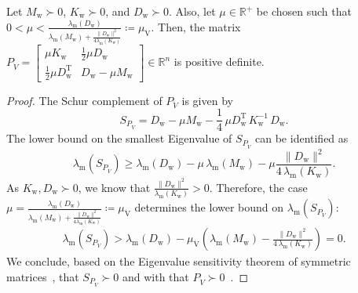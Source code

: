 \begin{lemma}\label{lemma:con:P_V_d_positive_definite}
    Let $M_\mathrm{w} \succ 0$, $K_\mathrm{w} \succ 0$, and $D_\mathrm{w} \succ 0$. Also, let $\mu \in \mathbb{R}^+$ be chosen such that $0 < \mu < \frac{\lambda_\mathrm{m}(D_\mathrm{w})}{\lambda_\mathrm{m}(M_\mathrm{w}) + \frac{\lVert D_\mathrm{w} \rVert^2}{4 \lambda_\mathrm{m} (K_\mathrm{w})}} \coloneqq \mu_{\dot{\mathrm{V}}}$.
    Then, the matrix $P_{\dot{V}} = \begin{bmatrix}
        \mu K_\mathrm{w} & \frac{1}{2} \mu D_\mathrm{w}\\
        \frac{1}{2} \mu D_\mathrm{w}^\mathrm{T} & D_\mathrm{w} - \mu M_\mathrm{w}
    \end{bmatrix} \in \mathbb{R}^{n}$ is positive definite.
\end{lemma}
\begin{proof}
    The Schur complement of $P_{\dot{V}}$ is given by
    \begin{equation}
        S_{P_{\dot{V}}} = D_\mathrm{w} - \mu M_\mathrm{w} - \frac{1}{4} \, \mu D_\mathrm{w}^\mathrm{T} \, K_\mathrm{w}^{-1} \, D_\mathrm{w}.
    \end{equation}
    The lower bound on the smallest Eigenvalue of $S_{P_{\dot{V}}}$ can be identified as
    \begin{equation}
        \lambda_\mathrm{m} \left (S_{P_{\dot{V}}} \right ) \geq \lambda_\mathrm{m}(D_\mathrm{w}) - \mu \, \lambda_\mathrm{m}(M_\mathrm{w}) - \mu \frac{\lVert D_\mathrm{w} \rVert^2}{4 \, \lambda_\mathrm{m}(K_\mathrm{w})}.
    \end{equation}
    As $K_\mathrm{w}, D_\mathrm{w} \succ 0$, we know that $\frac{\lVert D_\mathrm{w} \rVert^2}{\lambda_\mathrm{m}(K_\mathrm{w})} > 0$. Therefore, the case $\mu = \frac{\lambda_\mathrm{m}(D_\mathrm{w})}{\lambda_\mathrm{m}(M_\mathrm{w}) + \frac{\lVert D_\mathrm{w} \rVert^2}{4 \lambda_\mathrm{m} (K_\mathrm{w})}} \coloneqq \mu_{\dot{\mathrm{V}}}$ determines the lower bound on $\lambda_\mathrm{m}(S_{P_{\dot{V}}})$:
    \begin{equation}
    \begin{split}
        \lambda_\mathrm{m} \left (S_{P_{\dot{V}}} \right ) > \lambda_\mathrm{m}(D_\mathrm{w}) - \mu_{\dot{\mathrm{V}}} \left ( \lambda_\mathrm{m}(M_\mathrm{w}) - \frac{\lVert D_\mathrm{w} \rVert^2}{4 \, \lambda_\mathrm{m}(K_\mathrm{w})} \right ) = 0.
    \end{split}
    \end{equation}
    We conclude, based on the Eigenvalue sensitivity theorem of symmetric matrices~\cite{golub2013matrix}, that $S_{P_{\dot{V}}} \succ 0$ and with that $P_{\dot{V}} \succ 0$~\cite{boyd2004convex}.
\end{proof}

